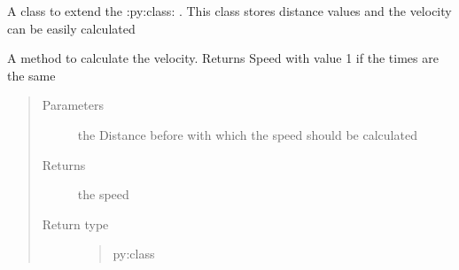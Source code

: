 \documentclass[letterpaper,10pt,english]{sphinxmanual}
\begin{document}
\begin{fulllineitems}
\label{\detokenize{data:lib.data.Distance}}
A class to extend the :py:class: . This class stores distance values and the
velocity can be easily calculated

\begin{fulllineitems}
\label{\detokenize{data:lib.data.Distance.velocity}}
A method to calculate the velocity. Returns Speed with value 1 if the times are the same
\begin{quote}\begin{description}
\item[{Parameters}] \leavevmode
{} \textendash{} the Distance before with which the speed should be calculated

\item[{Returns}] \leavevmode
the speed

\item[{Return type}] \leavevmode
\begin{quote}\begin{description}
\item[{py:class}] \leavevmode
{}

\end{description}\end{quote}


\end{description}\end{quote}

\end{fulllineitems}


\end{fulllineitems}


\ignorespaces 
\end{document}
